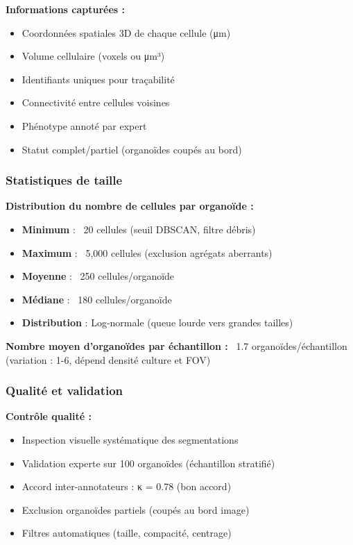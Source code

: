 \textbf{Informations capturées :}
\begin{itemize}
    \item Coordonnées spatiales 3D de chaque cellule (μm)
    \item Volume cellulaire (voxels ou μm³)
    \item Identifiants uniques pour traçabilité
    \item Connectivité entre cellules voisines
    \item Phénotype annoté par expert
    \item Statut complet/partiel (organoïdes coupés au bord)
\end{itemize}

\subsubsection{Statistiques de taille}

\textbf{Distribution du nombre de cellules par organoïde :}
\begin{itemize}
    \item \textbf{Minimum} : ~20 cellules (seuil DBSCAN, filtre débris)
    \item \textbf{Maximum} : ~5,000 cellules (exclusion agrégats aberrants)
    \item \textbf{Moyenne} : ~250 cellules/organoïde
    \item \textbf{Médiane} : ~180 cellules/organoïde
    \item \textbf{Distribution} : Log-normale (queue lourde vers grandes tailles)
\end{itemize}

\textbf{Nombre moyen d'organoïdes par échantillon :}
~1.7 organoïdes/échantillon (variation : 1-6, dépend densité culture et FOV)

\subsubsection{Qualité et validation}

\textbf{Contrôle qualité :}
\begin{itemize}
    \item Inspection visuelle systématique des segmentations
    \item Validation experte sur 100 organoïdes (échantillon stratifié)
    \item Accord inter-annotateurs : κ = 0.78 (bon accord)
    \item Exclusion organoïdes partiels (coupés au bord image)
    \item Filtres automatiques (taille, compacité, centrage)
\end{itemize}

